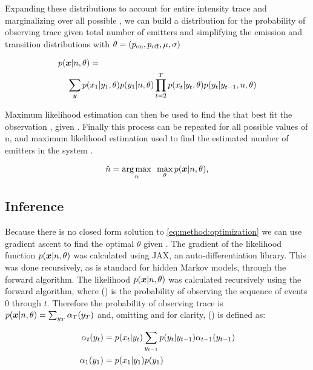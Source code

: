 Expanding these distributions to account for entire intensity trace \trace and marginalizing over all possible \states, we can build a distribution for the probability of observing trace \trace given total number of emitters \n and simplifying the emission and transition distributions with $\theta = (p_\text{on}, p_\text{off}, \mu, \sigma)$

\begin{align*}
  p(\bm{x}|n,\theta) &=\\
    \sum_{\bm{y}}
      p(&x_{1}|y_{1}, \theta)
      p(y_{1}|n, \theta)
      \prod_{t=2}^{T}
        p(x_{t}|y_{t}, \theta)
        p(y_{t}|y_{t-1},n, \theta)
  \label{eq:method:likelihood}
\end{align*}

Maximum likelihood estimation can then be used to find the \parameters that best fit the observation \trace, given \n. 
Finally this process can be repeated for all possible values of n, and maximum likelihood estimation used to find the estimated number of emitters in the system \estimatedn.

\begin{equation}
    \hat{n} =
    \mathop{\arg\max}_{n}\hspace{0.5em}
    \max_\theta
    p(\bm{x}|n,\theta)
  \text{,}
  \label{eq:method:optimization}
\end{equation}

\subsection{Inference}


Because there is no closed form solution to  \eqref{eq:method:optimization} we can use gradient ascent to find the optimal $\theta$ given \n.
The gradient of the likelihood function $p(\bm{x} | n, \theta)$ was calculated using JAX, an auto-differentiation library.
This was done recursively, as is standard for hidden Markov models, through the forward algorithm.
The likelihood $p(\bm{x} | n, \theta)$ was calculated recursively using the forward algorithm, where \pchain() is the probability of observing the sequence of events 0 through $t$.
Therefore the probability of observing trace \trace is $ p(\bm{x}|n,\theta) = \sum_{y_{T}} \alpha_T(y_{T})$ and, omitting \n and \parameters for clarity, \pchain()  is defined as:

\begin{align*}
  \alpha_{t}(y_{t}) &= p(x_{t}|y_{t}) \sum_{y_{t-1}} p(y_{t} | y_{t-1}) \alpha_{t-1}(y_{t-1})\\
  \alpha_{1}(y_{1}) &= p(x_{1}|y_{1}) p(y_{1})
\end{align*}

